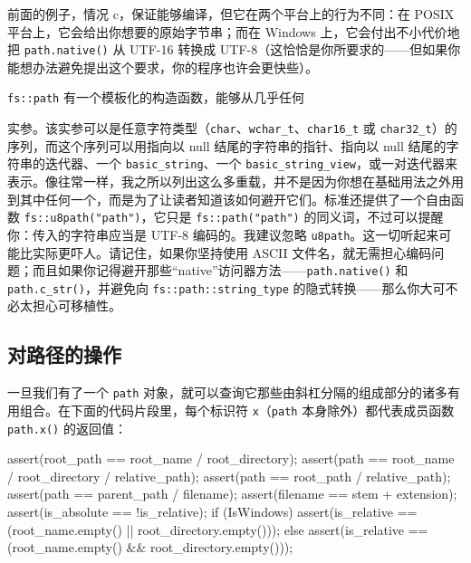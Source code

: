 前面的例子，情况 c，保证能够编译，但它在两个平台上的行为不同：在 POSIX 平台上，它会给出你想要的原始字节串；而在 Windows 上，它会付出不小代价地把 \texttt{path.\allowbreak{}native(\allowbreak{})\allowbreak{}} 从 UTF-16 转换成 UTF-8（这恰恰是你所要求的——但如果你能想办法避免提出这个要求，你的程序也许会更快些）。

\texttt{fs::\allowbreak{}path} 有一个模板化的构造函数，能够从几乎任何

实参。该实参可以是任意字符类型（\texttt{char}、\texttt{wchar\_\allowbreak{}t}、\texttt{char16\_\allowbreak{}t} 或 \texttt{char32\_\allowbreak{}t}）的序列，而这个序列可以用指向以 null 结尾的字符串的指针、指向以 null 结尾的字符串的迭代器、一个 \texttt{basic\_\allowbreak{}string}、一个 \texttt{basic\_\allowbreak{}string\_\allowbreak{}view}，或一对迭代器来表示。像往常一样，我之所以列出这么多重载，并不是因为你想在基础用法之外用到其中任何一个，而是为了让读者知道该如何避开它们。标准还提供了一个自由函数 \texttt{fs::\allowbreak{}u8path(\allowbreak{}"path")\allowbreak{}}，它只是 \texttt{fs::\allowbreak{}path(\allowbreak{}"path")\allowbreak{}} 的同义词，不过可以提醒你：传入的字符串应当是 UTF-8 编码的。我建议忽略 \texttt{u8path}。这一切听起来可能比实际更吓人。请记住，如果你坚持使用 ASCII 文件名，就无需担心编码问题；而且如果你记得避开那些“native”访问器方法——\texttt{path.\allowbreak{}native(\allowbreak{})\allowbreak{}} 和 \texttt{path.\allowbreak{}c\_\allowbreak{}str(\allowbreak{})\allowbreak{}}，并避免向 \texttt{fs::\allowbreak{}path::\allowbreak{}string\_\allowbreak{}type} 的隐式转换——那么你大可不必太担心可移植性。

\subsection{对路径的操作}

一旦我们有了一个 \texttt{path} 对象，就可以查询它那些由斜杠分隔的组成部分的诸多有用组合。在下面的代码片段里，每个标识符 \texttt{x}（\texttt{path} 本身除外）都代表成员函数 \texttt{path.\allowbreak{}x(\allowbreak{})\allowbreak{}} 的返回值：

\begin{codebox}[cpp]
    assert(root_path == root_name / root_directory);
    assert(path == root_name / root_directory / relative_path);
    assert(path == root_path / relative_path);
    assert(path == parent_path / filename);
    assert(filename == stem + extension);
    assert(is_absolute == !is_relative);
    if (IsWindows) {
      assert(is_relative == (root_name.empty() ||
    root_directory.empty()));
    } else {
      assert(is_relative == (root_name.empty() &&
    root_directory.empty()));
    }
\end{codebox}

